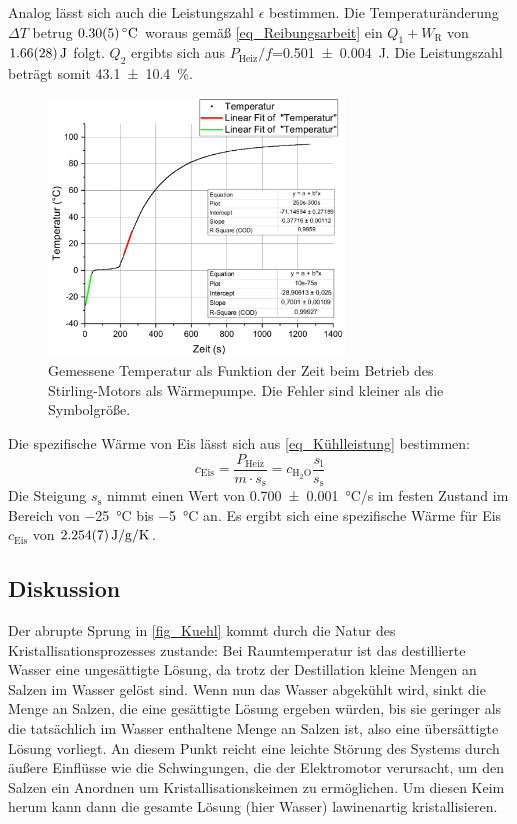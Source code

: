 \documentclass[
	a4paper,
	12pt,
	pagesize,
	ngerman
]{scrartcl}
\begin{document}
	Analog lässt sich auch die Leistungszahl $\epsilon$ bestimmen. 
	Die Temperaturänderung $\Delta{T}$ betrug $\SI{0,3+-0,05}{\degreeCelsius}$ woraus gemäß \cref{eq_Reibungsarbeit} ein $Q_1+W_\text{R}$ von $\SI{1,66+-0,28}{J}$ folgt. 
	$Q_2$ ergibts sich aus $P_\text{Heiz}/f$=\SI{0,501+-0,004}{J}.
	Die Leistungszahl beträgt somit \SI{43,1+-10,4}{\%}.
	\begin{figure}[H]
		\includegraphics[width=0.7\textwidth]{Waerm}
		\centering
		\caption{Gemessene Temperatur als Funktion der Zeit beim Betrieb des Stirling-Motors als Wärmepumpe. Die Fehler sind kleiner als die Symbolgröße.}
		\label{fig_Waerm}
		\centering
	\end{figure}

	Die spezifische Wärme von Eis lässt sich aus \cref{eq_Kühlleistung} bestimmen:
	\begin{equation}
		c_\text{Eis} = \frac{P_\text{Heiz}}{m \cdot s_\text{s}} = c_{\text{H}_2\text{O}} \frac{s_\text{l}}{s_\text{s}}
	\end{equation} 
	Die Steigung $s_\text{s}$ nimmt einen Wert von \SI{0,700+-0,001}{\degreeCelsius/s} im festen Zustand im Bereich von \SI{-25}{\degreeCelsius} bis \SI{-5}{\degreeCelsius} an.
	Es ergibt sich eine spezifische Wärme für Eis $c_\text{Eis}$ von $\SI{2,254+-0,007}{J/g/K}$.
	\subsection{Diskussion}
	
	Der abrupte Sprung in \cref{fig_Kuehl} kommt durch die Natur des Kristallisationsprozesses zustande:
	Bei Raumtemperatur ist das destillierte Wasser eine ungesättigte Lösung, da trotz der Destillation kleine Mengen an Salzen im Wasser gelöst sind.
	Wenn nun das Wasser abgekühlt wird, sinkt die Menge an Salzen, die eine gesättigte Lösung ergeben würden, bis sie geringer als die tatsächlich im Wasser enthaltene Menge an Salzen ist, also eine übersättigte Lösung vorliegt.
	An diesem Punkt reicht eine leichte Störung des Systems durch äußere Einflüsse wie die Schwingungen, die der Elektromotor verursacht, um den Salzen ein Anordnen um Kristallisationskeimen zu ermöglichen.
	Um diesen Keim herum kann dann die gesamte Lösung (hier Wasser) lawinenartig kristallisieren.
	
\end{document}
